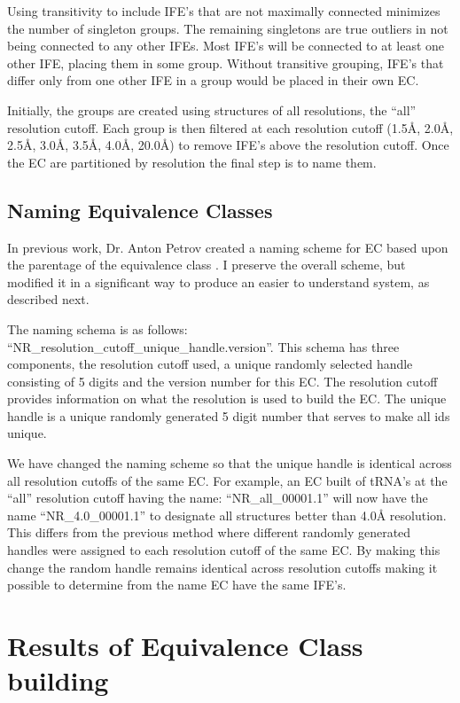 Using transitivity to include IFE's that are not maximally connected minimizes
the number of singleton groups. The remaining singletons are true outliers in
not being connected to any other IFEs. Most IFE's will be connected to at least
one other IFE, placing them in some group. Without transitive grouping,
IFE's that differ only from one other IFE in a group would be placed in their
own EC.

Initially, the groups are created using structures of all resolutions, the
``all'' resolution cutoff. Each group is then filtered at each resolution cutoff
(1.5{\AA}, 2.0{\AA}, 2.5{\AA}, 3.0{\AA}, 3.5{\AA}, 4.0{\AA}, 20.0{\AA}) to
remove IFE's above the resolution cutoff. Once the EC are partitioned by
resolution the final step is to name them.

\subsection{Naming Equivalence Classes}

In previous work, Dr. Anton Petrov created a naming scheme for EC based upon the
parentage of the equivalence class \cite{Petrov2013}. I preserve the overall
scheme, but modified it in a significant way to produce an easier to understand
system, as described next.

The naming schema is as follows:
``NR\_{resolution\_cutoff}\_{unique\_handle}.{version}''. This schema has three
components, the resolution cutoff used, a unique randomly selected handle
consisting of 5 digits and the version number for this EC. The resolution cutoff
provides information on what the resolution is used to build the EC. The unique
handle is a unique randomly generated 5 digit number that serves to make all ids
unique.

We have changed the naming scheme so that the unique handle is identical across
all resolution cutoffs of the same EC. For example, an EC built of tRNA's at the
``all'' resolution cutoff having the name: ``NR\_all\_00001.1'' will now have
the name ``NR\_4.0\_00001.1'' to designate all structures better than 4.0{\AA}
resolution. This differs from the previous method where different randomly
generated handles were assigned to each resolution cutoff of the same EC. By
making this change the random handle remains identical across resolution cutoffs
making it possible to determine from the name EC have the same IFE's.

\section{Results of Equivalence Class building}

